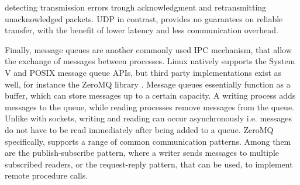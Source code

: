 detecting transmission errors trough acknowledgment and retransmitting unacknowledged packets. \ac{UDP} in contrast, provides no guarantees on reliable transfer, with the benefit of lower latency and less communication overhead. \cite[p.29ff.]{stevens1998sock}
\par
{}
Finally, message queues are another commonly used \ac{IPC} mechanism, that allow the exchange of messages between processes. Linux natively supports the System V and POSIX message queue APIs, but third party
implementations exist as well, for instance the ZeroMQ library \cite{systemvshm,posixmsq,zeromq}. Message queues essentially function as a buffer, which can store messages up to a certain capacity. A writing process adds messages to the queue, while
reading processes remove messages from the queue. Unlike with sockets, writing and reading can occur asynchronously i.e. messages do not have to be read immediately after being added to a queue. ZeroMQ specifically, supports a range of common communication 
patterns. Among them are the publish-subscribe pattern, where a writer sends messages to multiple subscribed readers, or the request-reply pattern, that can be used, to implement remote procedure calls.         


